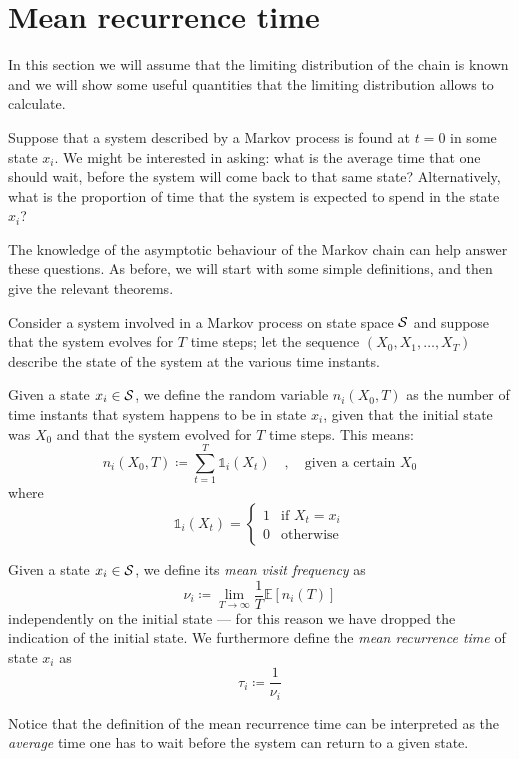 \section{Mean recurrence time}
In this section we will assume that the limiting distribution of the chain is known and we will show some useful quantities that the limiting distribution allows to calculate.

Suppose that a system described by a Markov process is found at $t = 0$ in some state $x_i$. We might be interested in asking: what is the average time that one should wait, before the system will come back to that same state? Alternatively, what is the proportion of time that the system is expected to spend in the state $x_i$?

The knowledge of the asymptotic behaviour of the Markov chain can help answer these questions. As before, we will start with some simple definitions, and then give the relevant theorems.

\medskip
Consider a system involved in a Markov process on state space $\mathcal{S}$ and suppose that the system evolves for $T$ time steps; let the sequence $(X_0, X_1, \dots, X_T)$ describe the state of the system at the various time instants.
\begin{ndef} 
    Given a state $x_i \in \mathcal{S}$, we define the random variable $n_i (X_0, T)$ as the number of time instants that system happens to be in state $x_i$, given that the initial state was $X_0$ and that the system evolved for $T$ time steps. This means:
    \begin{equation}
        n_i (X_0, T) \coloneqq \sum_{t = 1}^T \mathds{1}_i(X_t) \quad , \quad \text{given a certain }X_0
    \end{equation}
    where
    \begin{equation}
        \mathds{1}_i(X_t) =
        \begin{cases}
            1 & \text{if $X_t = x_i$} \\
            0 & \text{otherwise}
        \end{cases}
    \end{equation}
\end{ndef}
\begin{ndef}  \label{def:nu-tau}
    Given a state $x_i \in \mathcal{S}$, we define its \emph{mean visit frequency} as
    \begin{equation}
        \nu_i \coloneqq \lim_{T\rightarrow \infty} \frac{1}{T} \mathds{E} \left[ n_i (T) \right]
    \end{equation}
    independently on the initial state --- for this reason we have dropped the indication of the initial state.
    We furthermore define the \emph{mean recurrence time} of state $x_i$ as
    \begin{equation} \label{def:mean_rec_time}
        \tau_i \coloneqq \frac{1}{\nu_i}
    \end{equation}
\end{ndef}
Notice that the definition of the mean recurrence time can be interpreted as the \emph{average} time one has to wait before the system can return to a given state.

